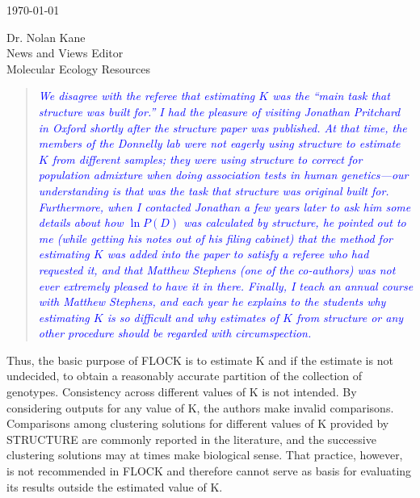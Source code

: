 \documentclass[11pt]{letter}
\newcommand{\reply}[1]{\begin{quotation}\small\sl\textcolor{blue}{#1}\end{quotation}}
\begin{document}
\begin{letter}{ \today 

Dr. Nolan Kane\\
News and Views Editor\\
Molecular Ecology Resources \\
}
\reply{We disagree with the referee that estimating $K$ was the ``main task that {\sc structure} was
built for.''  I had the pleasure of visiting Jonathan Pritchard in Oxford shortly after the
{\sc structure} paper was published. At that time, the members of the Donnelly lab were not eagerly using
{\sc structure} to estimate $K$ from different samples; they were using {\sc structure} to correct
for population admixture when doing association tests in human genetics---our understanding
is {\em that} was the task that structure was original built for.  Furthermore, when I contacted
Jonathan a few years later to ask him some details about how $\ln P(D)$ was calculated by {\sc structure},
he pointed out to me (while getting his notes out of his filing cabinet) that the method for estimating
$K$ was added into the paper to satisfy a referee who had requested it, and that Matthew Stephens 
(one of the co-authors) was not ever extremely pleased to have it in there.  Finally, I teach an annual
course with Matthew Stephens, and each year he explains to the students why estimating $K$ is so
difficult and why estimates of $K$ from {\sc structure} or any other procedure should be 
regarded with circumspection.  }


Thus, the basic purpose of FLOCK is to estimate K and if the estimate is not undecided, to obtain a reasonably accurate partition of the collection of genotypes. Consistency across different values of K is not intended. By considering outputs for any value of K, the authors make invalid comparisons. Comparisons among clustering solutions for different values of K provided by STRUCTURE are commonly reported in the literature, and the successive clustering solutions may at times make biological sense. That practice, however, is not recommended in FLOCK and therefore cannot serve as basis for evaluating its results outside the estimated value of K.


\end{letter}
\end{document}
